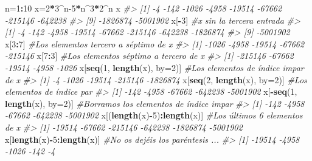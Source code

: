 \documentclass[
]{book}
\newenvironment{Shaded}{\begin{snugshade}}{\end{snugshade}}
\newcommand{\CommentTok}[1]{\textcolor[rgb]{0.56,0.35,0.01}{\textit{#1}}}
\newcommand{\DataTypeTok}[1]{\textcolor[rgb]{0.13,0.29,0.53}{#1}}
\newcommand{\DecValTok}[1]{\textcolor[rgb]{0.00,0.00,0.81}{#1}}
\newcommand{\KeywordTok}[1]{\textcolor[rgb]{0.13,0.29,0.53}{\textbf{#1}}}
\newcommand{\NormalTok}[1]{#1}
\newcommand{\OperatorTok}[1]{\textcolor[rgb]{0.81,0.36,0.00}{\textbf{#1}}}
\theoremstyle{definition}
\theoremstyle{definition}
\theoremstyle{definition}
\theoremstyle{remark}
\begin{document}
\begin{Shaded}
\begin{Highlighting}[]
\NormalTok{n=}\DecValTok{1}\OperatorTok{:}\DecValTok{10}
\NormalTok{x=}\DecValTok{2}\OperatorTok{*}\DecValTok{3}\OperatorTok{\^{}}\NormalTok{n}\DecValTok{{-}5}\OperatorTok{*}\NormalTok{n}\OperatorTok{\^{}}\DecValTok{3}\OperatorTok{*}\DecValTok{2}\OperatorTok{\^{}}\NormalTok{n}
\NormalTok{x}
\CommentTok{\#\textgreater{}  [1]       {-}4     {-}142    {-}1026    {-}4958   {-}19514   {-}67662  {-}215146  {-}642238}
\CommentTok{\#\textgreater{}  [9] {-}1826874 {-}5001902}
\NormalTok{x[}\OperatorTok{{-}}\DecValTok{3}\NormalTok{] }\CommentTok{\#x sin la tercera entrada}
\CommentTok{\#\textgreater{} [1]       {-}4     {-}142    {-}4958   {-}19514   {-}67662  {-}215146  {-}642238 {-}1826874}
\CommentTok{\#\textgreater{} [9] {-}5001902}
\NormalTok{x[}\DecValTok{3}\OperatorTok{:}\DecValTok{7}\NormalTok{] }\CommentTok{\#Los elementos tercero a séptimo de x}
\CommentTok{\#\textgreater{} [1]   {-}1026   {-}4958  {-}19514  {-}67662 {-}215146}
\NormalTok{x[}\DecValTok{7}\OperatorTok{:}\DecValTok{3}\NormalTok{] }\CommentTok{\#Los elementos séptimo a tercero de x}
\CommentTok{\#\textgreater{} [1] {-}215146  {-}67662  {-}19514   {-}4958   {-}1026}
\NormalTok{x[}\KeywordTok{seq}\NormalTok{(}\DecValTok{1}\NormalTok{, }\KeywordTok{length}\NormalTok{(x), }\DataTypeTok{by=}\DecValTok{2}\NormalTok{)] }\CommentTok{\#Los elementos de índice impar de x}
\CommentTok{\#\textgreater{} [1]       {-}4    {-}1026   {-}19514  {-}215146 {-}1826874}
\NormalTok{x[}\KeywordTok{seq}\NormalTok{(}\DecValTok{2}\NormalTok{, }\KeywordTok{length}\NormalTok{(x), }\DataTypeTok{by=}\DecValTok{2}\NormalTok{)] }\CommentTok{\#Los elementos de índice par }
\CommentTok{\#\textgreater{} [1]     {-}142    {-}4958   {-}67662  {-}642238 {-}5001902}
\NormalTok{x[}\OperatorTok{{-}}\KeywordTok{seq}\NormalTok{(}\DecValTok{1}\NormalTok{, }\KeywordTok{length}\NormalTok{(x), }\DataTypeTok{by=}\DecValTok{2}\NormalTok{)] }\CommentTok{\#Borramos los elementos de índice impar}
\CommentTok{\#\textgreater{} [1]     {-}142    {-}4958   {-}67662  {-}642238 {-}5001902}
\NormalTok{x[(}\KeywordTok{length}\NormalTok{(x)}\OperatorTok{{-}}\DecValTok{5}\NormalTok{)}\OperatorTok{:}\KeywordTok{length}\NormalTok{(x)] }\CommentTok{\#Los últimos 6 elementos de x}
\CommentTok{\#\textgreater{} [1]   {-}19514   {-}67662  {-}215146  {-}642238 {-}1826874 {-}5001902}
\NormalTok{x[}\KeywordTok{length}\NormalTok{(x)}\OperatorTok{{-}}\DecValTok{5}\OperatorTok{:}\KeywordTok{length}\NormalTok{(x)] }\CommentTok{\#No os dejéis los paréntesis ...}
\CommentTok{\#\textgreater{} [1] {-}19514  {-}4958  {-}1026   {-}142     {-}4}
\end{Highlighting}
\end{Shaded}
\end{document}
